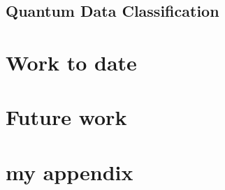 \documentclass[english,a4paper,11pt,oneside,onecolumn]{book}
\begin{document}
\section{Quantum Data Classification}
\label{sec:qmlDataClass}

\chapter{Work to date}
\label{sec:wtd}


\chapter{Future work}
\label{sec:fw}


\nocite{}



\appendix
\chapter{my appendix}
\end{document}
